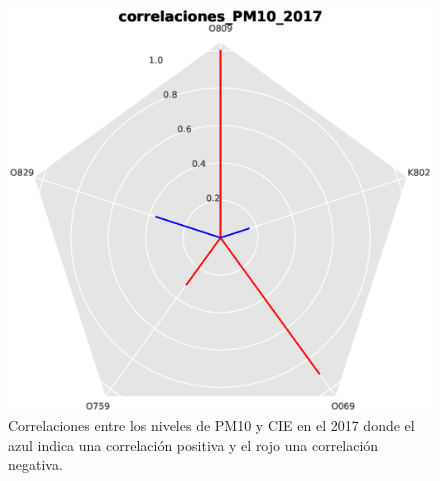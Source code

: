 \begin{figure}[h!]
\setcounter{figure}{1} %
\captionsetup{type=figure} %
\begin{center}
   \includegraphics[trim=0 0 0 23,clip,width=1\textwidth]{spiderweb_correlaciones_PM10_2017}
   \end{center}
    \caption[Correlaciones 2017 PM10]{Correlaciones entre los niveles de PM10 y CIE en el 2017 donde el azul indica una correlación positiva y el rojo una correlación negativa.}
    \label{correlaciones_2017_PM10}
\end{figure}

